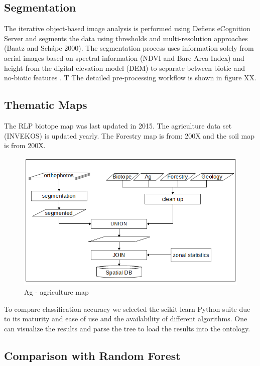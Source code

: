 \documentclass[authoryear, review,12pt,number]{elsarticle}
\begin{document}
\subsection{Segmentation} The iterative object-based image analysis is
performed using Defiens eCognition Server and segments the data using
thresholds and multi-resolution approaches (Baatz and Sch\'ape 2000). The
segmentation process uses information solely from aerial images based on
spectral information (NDVI and Bare Area Index) and height from the digital
elevation model (DEM) to separate between biotic and no-biotic features
\citep{Tintrup2015}. T The detailed pre-processing workflow is shown in figure
XX.
\subsection{Thematic Maps} The RLP biotope map was last updated in 2015. The
agriculture data set (INVEKOS) is updated yearly. The Forestry map is from:
200X and the soil map is from 200X.

\begin{figure} \includegraphics[width=1\textwidth]{diagrams/pre_processing.png}
    \caption{Ag - agriculture map} \end{figure}
To compare classification accuracy we selected the scikit-learn Python suite
\citep{scikit-learn} due to its maturity and ease of use and the availability of
different algorithms. One can visualize the results and parse the tree to load
the results into the ontology.
\subsection{Comparison with Random Forest}
\end{document}
